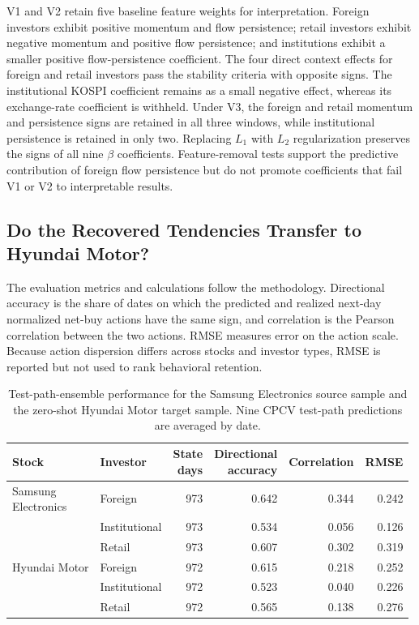 \documentclass[sigconf,anonymous,review]{acmart}
\begin{document}
V1 and V2 retain five baseline feature weights for interpretation. Foreign investors exhibit positive momentum and flow persistence; retail investors exhibit negative momentum and positive flow persistence; and institutions exhibit a smaller positive flow-persistence coefficient. The four direct context effects for foreign and retail investors pass the stability criteria with opposite signs. The institutional KOSPI coefficient remains as a small negative effect, whereas its exchange-rate coefficient is withheld. Under V3, the foreign and retail momentum and persistence signs are retained in all three windows, while institutional persistence is retained in only two. Replacing $L_1$ with $L_2$ regularization preserves the signs of all nine $\beta$ coefficients. Feature-removal tests support the predictive contribution of foreign flow persistence but do not promote coefficients that fail V1 or V2 to interpretable results.

\subsection{Do the Recovered Tendencies Transfer to Hyundai Motor?}
\label{sec:transfer-results}

The evaluation metrics and calculations follow the methodology. Directional accuracy is the share of dates on which the predicted and realized next-day normalized net-buy actions have the same sign, and correlation is the Pearson correlation between the two actions. RMSE measures error on the action scale. Because action dispersion differs across stocks and investor types, RMSE is reported but not used to rank behavioral retention.

\begin{table}[t]
  \caption{Test-path-ensemble performance for the Samsung Electronics source sample and the zero-shot Hyundai Motor target sample. Nine CPCV test-path predictions are averaged by date.}
  \label{tab:cross-stock-performance}
  \centering
  \scriptsize
  \setlength{\tabcolsep}{2pt}
  \begin{tabular}{@{}llrrrr@{}}
    \toprule
    Stock & Investor & \shortstack{State\\days} & \shortstack{Directional\\accuracy} & Correlation & RMSE \\
    \midrule
    \shortstack[l]{Samsung\\Electronics} & Foreign       & 973 & 0.642 & 0.344 & 0.242 \\
                                          & Institutional & 973 & 0.534 & 0.056 & 0.126 \\
                                          & Retail        & 973 & 0.607 & 0.302 & 0.319 \\
    \addlinespace
    Hyundai Motor       & Foreign       & 972 & 0.615 & 0.218 & 0.252 \\
                        & Institutional & 972 & 0.523 & 0.040 & 0.226 \\
                        & Retail        & 972 & 0.565 & 0.138 & 0.276 \\
    \bottomrule
  \end{tabular}
\end{table}
\end{document}
